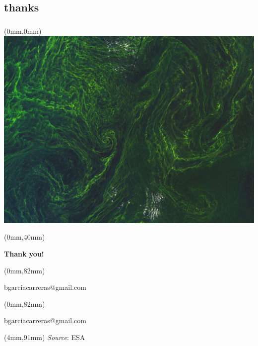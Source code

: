 \documentclass{beamer}
\begin{document}
\subsection{thanks}
\begin{frame}[plain]
  \frametitle{}

  \begin{textblock*}{13cm}(0mm,0mm)%
    \includegraphics[width=\textwidth]{figs/Algae_storm2.jpg}
  \end{textblock*}

  \begin{textblock*}{13cm}(0mm,40mm)%
    \begin{center}
      {\Huge \bf \color{white} Thank you!}
    \end{center}
  \end{textblock*}

  \begin{textblock*}{13cm}(0mm,82mm)%
    \begin{center}
      {\Large \color{white} bgarciacarreras@gmail.com}
    \end{center}
  \end{textblock*}

  \begin{textblock*}{13cm}(0mm,82mm)%
    \begin{center}
      {\Large \color{white} bgarciacarreras@gmail.com}
    \end{center}
  \end{textblock*}

  \begin{textblock*}{13cm}(4mm,91mm)%
    {\tiny \color{white} \textit{Source}: ESA}
  \end{textblock*}
\end{frame}
\end{document}
